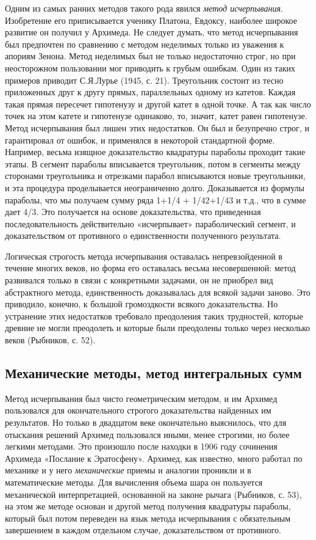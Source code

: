 Одним из самых ранних методов такого рода явился \emph{метод
исчерпывания}. Изобретение его приписывается ученику Платона,
Евдоксу, наиболее широкое развитие он получил у Архимеда. Не следует
думать, что метод исчерпывания был предпочтен по сравнению с методом
неделимых только из уважения к апориям Зенона. Метод неделимых был не
только недостаточно строг, но при неосторожном пользовании мог
приводить к грубым ошибкам. Один из таких примеров приводит С.Я.Лурье
(1945, с. 21). Треугольник состоит из тесно приложенных друг к другу
прямых, параллельных одному из катетов. Каждая такая прямая пересечет
гипотенузу и другой катет в одной точке. А так как число точек на этом
катете и гипотенузе одинаково, то, значит, катет равен гипотенузе.
Метод исчерпывания был лишен этих недостатков. Он был и безупречно
строг, и гарантировал от ошибок, и применялся в некоторой стандартной
форме. Например, весьма изящное доказательство квадратуры параболы
проходит такие этапы. В сегмент параболы вписывается треугольник,
потом в сегменты между сторонами треугольника и отрезками парабол
вписываются новые треугольники, и эта процедура проделывается
неограниченно долго. Доказывается из формулы параболы, что мы
получаем сумму ряда 1+1/4 + 1/42+1/43 и т.д., что в сумме дает 4/3.
Это получается на основе доказательства, что приведенная
последовательность действительно «исчерпывает» параболический сегмент,
и доказательством от противного о единственности полученного
результата.

Логическая строгость метода исчерпывания оставалась непревзойденной в
течение многих веков, но форма его оставалась весьма несовершенной:
метод развивался только в связи с конкретными задачами, он не приобрел
вид абстрактного метода, единственность доказывалась для всякой задачи
заново. Это приводило, конечно, к большой громоздкости всякого
доказательства. Но устранение этих недостатков требовало преодоления
таких трудностей, которые древние не могли преодолеть и которые были
преодолены только через несколько веков (Рыбников, с. 52).

\subsection{Механические методы, метод интегральных сумм}

Метод исчерпывания был чисто геометрическим методом, и им Архимед
пользовался для окончательного строгого доказательства найденных им
результатов. Но только в двадцатом веке окончательно выяснилось, что
для отыскания решений Архимед пользовался иными, менее строгими, но
более легкими методами. Это произошло после находки в 1906 году
сочинения Архимеда «Послание к Эратосфену». Архимед, как известно,
много работал по механике и у него \emph{механические} приемы и
аналогии проникли и в математические методы. Для вычисления объема
шара он пользуется механической интерпретацией, основанной на законе
рычага (Рыбников, с. 53), на этом же методе основан и другой метод
получения квадратуры параболы, который был потом переведен на язык
метода исчерпывания с обязательным завершением в каждом отдельном
случае, доказательством от противного.

